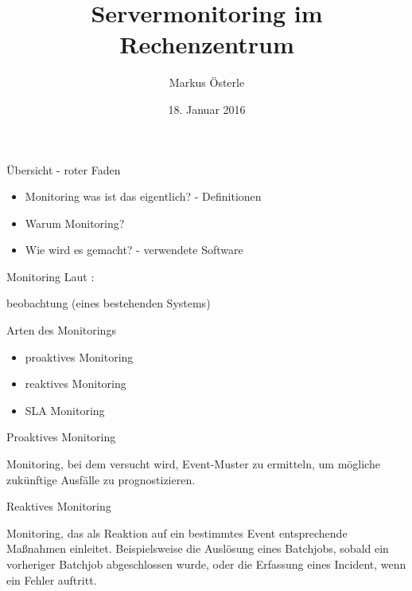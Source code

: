 \documentclass[11pt]{beamer}
\author{Markus Österle}
\title{Servermonitoring im Rechenzentrum}
\date{18. Januar 2016}
\begin{document}
\begin{frame}
\titlepage
\end{frame}


\begin{frame}{Übersicht - roter Faden}
\begin{itemize}
	\item Monitoring was ist das eigentlich? - Definitionen
	\item Warum Monitoring?
	\item Wie wird es gemacht? - verwendete Software
\end{itemize}
\end{frame}
\begin{frame}{Monitoring}
	Laut \cite[S. 701; Stichwort Monitoring]{duden}: \\
	
	\begin{center}
		\glqq [Dauer]beobachtung (eines bestehenden Systems)\grqq
	\end{center}
	
\end{frame}
\begin{frame}{Arten des Monitorings}
	\begin{itemize}
		\item proaktives Monitoring
		\item reaktives Monitoring
		\item SLA Monitoring
	\end{itemize}
\end{frame}
\begin{frame}{Proaktives Monitoring}
	\begin{center}
		Monitoring, bei dem versucht wird, Event-Muster zu ermitteln, um mögliche zukünftige Ausfälle zu prognostizieren.
	\end{center}
	 
\end{frame}
\begin{frame}{Reaktives Monitoring}
	\begin{center}
		Monitoring, das als Reaktion auf ein bestimmtes Event entsprechende Maßnahmen einleitet. Beispielsweise die Auslösung eines Batchjobs, sobald ein vorheriger Batchjob abgeschlossen wurde, oder die Erfassung eines Incident, wenn ein Fehler auftritt. 
	\end{center}
\end{frame}
\end{document}
